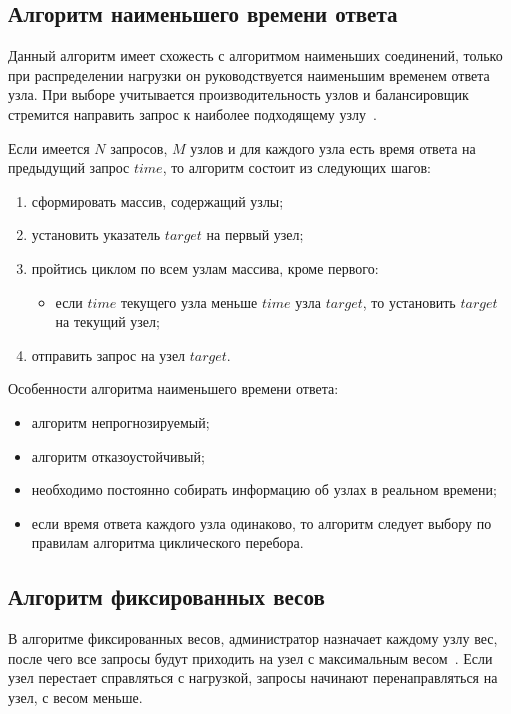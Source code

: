 \subsection{Алгоритм наименьшего времени ответа}

Данный алгоритм имеет схожесть с алгоритмом наименьших соединений, только при распределении нагрузки он руководствуется наименьшим временем ответа узла.
При выборе учитывается производительность узлов и балансировщик стремится направить запрос к наиболее подходящему узлу~\cite{aws}.

Если имеется $N$ запросов, $M$ узлов и для каждого узла есть время ответа на предыдущий запрос $time$, то алгоритм состоит из следующих шагов:

\begin{enumerate}
	\item сформировать массив, содержащий узлы;
	\item установить указатель $target$ на первый узел;
	\item пройтись циклом по всем узлам массива, кроме первого:
	\begin{itemize}
		\item если $time$ текущего узла меньше $time$ узла $target$, то установить $target$ на текущий узел; 
	\end{itemize}
	\item отправить запрос на узел $target$.
\end{enumerate}

Особенности алгоритма наименьшего времени ответа:
\begin{itemize}
	\item алгоритм непрогнозируемый; 
	\item алгоритм отказоустойчивый;
	\item необходимо постоянно собирать информацию об узлах в реальном времени;
	\item если время ответа каждого узла одинаково, то алгоритм следует выбору по правилам алгоритма циклического перебора.
\end{itemize}

\subsection{Алгоритм фиксированных весов}

В алгоритме фиксированных весов, администратор назначает каждому узлу вес, после чего все запросы будут приходить на узел с максимальным весом~\cite{kemp}.
Если узел перестает справляться с нагрузкой, запросы начинают перенаправляться на узел, с весом меньше.

